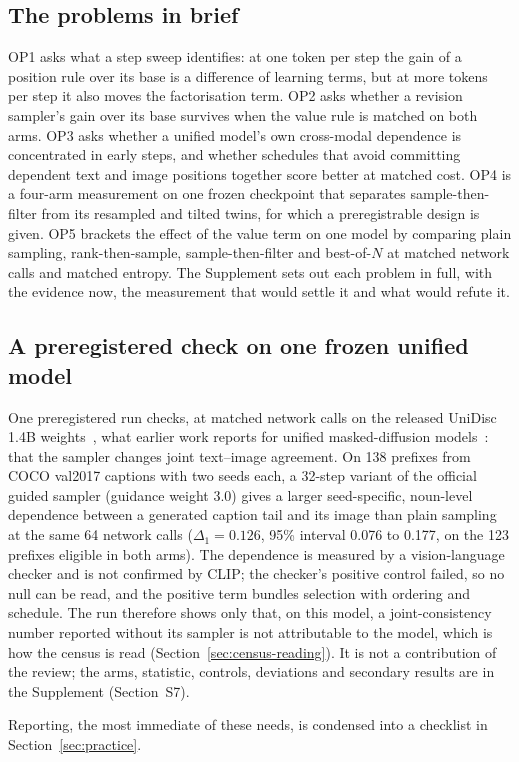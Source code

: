 \subsection{The problems in brief}
\label{sec:open-op1}\label{sec:open-op2}\label{sec:open-op3}\label{sec:open-op4}\label{sec:open-v}
OP1 asks what a step sweep identifies: at one token per step the gain of a position rule over its base is a difference of learning terms, but at more tokens per step it also moves the factorisation term. OP2 asks whether a revision sampler's gain over its base survives when the value rule is matched on both arms. OP3 asks whether a unified model's own cross-modal dependence is concentrated in early steps, and whether schedules that avoid committing dependent text and image positions together score better at matched cost. OP4 is a four-arm measurement on one frozen checkpoint that separates sample-then-filter from its resampled and tilted twins, for which a preregistrable design is given. OP5 brackets the effect of the value term on one model by comparing plain sampling, rank-then-sample, sample-then-filter and best-of-$N$ at matched network calls and matched entropy. The Supplement sets out each problem in full, with the evidence now, the measurement that would settle it and what would refute it.

\subsection{A preregistered check on one frozen unified model}
\label{sec:exp003}

One preregistered run checks, at matched network calls on the released UniDisc 1.4B weights~\cite{arXiv:2503.20853}, what earlier work reports for unified masked-diffusion models~\cite{arXiv:2607.13188,arXiv:2511.09611}: that the sampler changes joint text--image agreement. On 138 prefixes from COCO val2017 captions with two seeds each, a 32-step variant of the official guided sampler (guidance weight 3.0) gives a larger seed-specific, noun-level dependence between a generated caption tail and its image than plain sampling at the same 64 network calls ($\Delta_1=0.126$, 95\% interval 0.076 to 0.177, on the 123 prefixes eligible in both arms). The dependence is measured by a vision-language checker and is not confirmed by CLIP; the checker's positive control failed, so no null can be read, and the positive term bundles selection with ordering and schedule. The run therefore shows only that, on this model, a joint-consistency number reported without its sampler is not attributable to the model, which is how the census is read (Section~\ref{sec:census-reading}). It is not a contribution of the review; the arms, statistic, controls, deviations and secondary results are in the Supplement (Section~S7).

Reporting, the most immediate of these needs, is condensed into a checklist in Section~\ref{sec:practice}.

